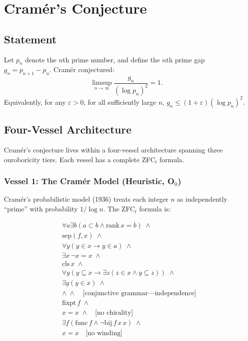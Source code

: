 \documentclass[12pt]{article}
\begin{document}
\section{Cram\'er's Conjecture}

\subsection{Statement}

\begin{definition}
Let $p_n$ denote the $n$th prime number, and define the $n$th prime gap
$g_n = p_{n+1}-p_n$. Cram\'er conjectured:
\begin{equation}\label{eq:cramer}
\limsup_{n\to\infty} \frac{g_n}{(\log p_n)^2} = 1.
\end{equation}
Equivalently, for any $\varepsilon>0$, for all sufficiently large $n$,
$g_n \le (1+\varepsilon)(\log p_n)^2$.
\end{definition}

\subsection{Four-Vessel Architecture}

Cram\'er's conjecture lives within a four-vessel architecture spanning
three ouroboricity tiers. Each vessel has a complete ZFC${}_t$ formula.

\subsubsection*{Vessel 1: The Cram\'er Model (Heuristic, O$_0$)}

Cram\'er's probabilistic model (1936) treats each integer $n$ as
independently ``prime'' with probability $1/\log n$. The ZFC${}_t$
formula is:

\begin{equation}\label{eq:cramer_model_zfc}
\begin{aligned}
&\forall a\exists b(a\subset b \land \text{rank}\,x=b) \;\land \\
&\text{sep}(f,x) \;\land \\
&\forall y(y\in x \to y\in a) \;\land \\
&\exists x\,\lnot x=x \;\land \\
&\text{cls}\,x \;\land \\
&\forall y(y\subseteq x \to \exists z(z\in x \land y\subseteq z)) \;\land \\
&\exists y(y\in x) \;\land \\
&\land \;\land \quad\text{[conjunctive grammar---independence]} \\
&\text{fixpt}\,f \;\land \\
&x=x \;\land \quad\text{[no chirality]} \\
&\exists f(\text{func}\,f \land \lnot\text{bij}\,f\,x\,x) \;\land \\
&x=x \quad\text{[no winding]}
\end{aligned}
\end{equation}
\end{document}
